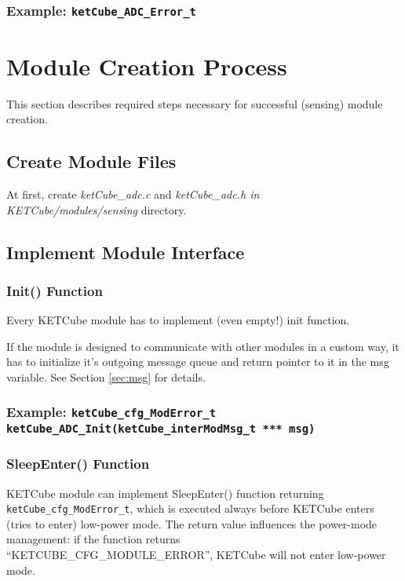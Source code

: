 \documentclass[twoside,a4paper]{refart}
\begin{document}
\subsubsection*{Example: {\tt ketCube\_ADC\_Error\_t}}

\clearpage
\section{Module Creation Process}
This section describes required steps necessary for successful (sensing) module creation.

\subsection*{Create Module Files}
At first, create {\it ketCube\_adc.c} and {\it ketCube\_adc.h in} \\{\it KETCube/modules/sensing} directory.


\subsection*{Implement Module Interface}
\subsubsection*{Init() Function}
Every KETCube module has to implement (even empty!) init function.

If the module is designed to communicate with other modules in a custom way, it has to initialize it's outgoing message queue and return pointer to it in the msg variable. See Section \ref{sec:msg} for details.

\subsubsection*{Example: {\tt ketCube\_cfg\_ModError\_t ketCube\_ADC\_Init(ketCube\_interModMsg\_t *** msg)}}

\subsubsection*{SleepEnter() Function}
KETCube module can implement SleepEnter() function returning\\{\tt ketCube\_cfg\_ModError\_t}, which is executed always before KETCube enters (tries to enter) low-power mode. The return value influences the power-mode management: if the function returns\\“KETCUBE\_CFG\_MODULE\_ERROR”, KETCube will not enter low-power mode.
\end{document}

